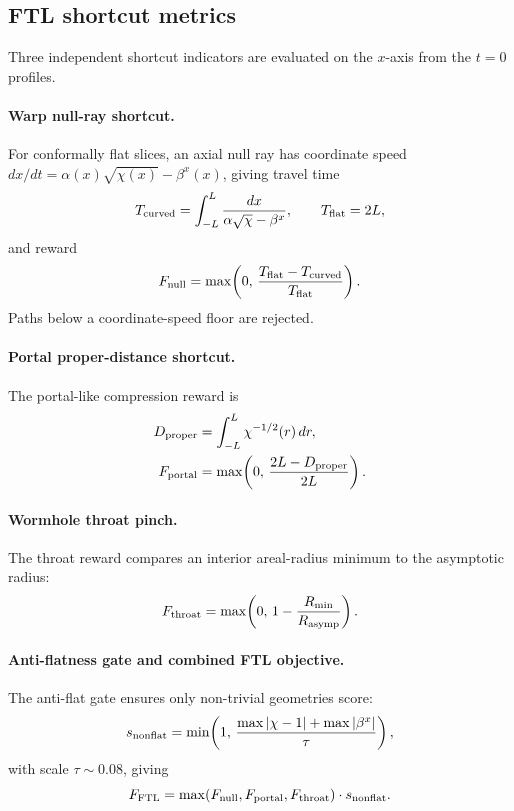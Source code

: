 \documentclass[twocolumn,floatfix,aps,prd,nofootinbib]{revtex4-2}
\begin{document}
\subsection{FTL shortcut metrics}

Three independent shortcut indicators are evaluated on the $x$-axis from the $t=0$ profiles.

\paragraph{Warp null-ray shortcut.}
For conformally flat slices, an axial null ray has coordinate speed $dx/dt = \alpha(x)\sqrt{\chi(x)} - \beta^x(x)$, giving travel time
\begin{equation}
    T_{\rm curved} = \int_{-L}^{L}\frac{dx}{\alpha\sqrt{\chi}-\beta^x}, \qquad
    T_{\rm flat} = 2L,
\end{equation}
and reward
\begin{equation}
    F_{\rm null} = \max\!\left(0,\,\frac{T_{\rm flat}-T_{\rm curved}}{T_{\rm flat}}\right).
\end{equation}
Paths below a coordinate-speed floor are rejected.

\paragraph{Portal proper-distance shortcut.}
The portal-like compression reward is
\begin{align}
    D_{\rm proper}
    &= \int_{-L}^{L}\chi^{-1/2}(r)\,dr, \notag\\
    F_{\rm portal}
    &= \max\!\left(0,\,\frac{2L-D_{\rm proper}}{2L}\right).
\end{align}

\paragraph{Wormhole throat pinch.}
The throat reward compares an interior areal-radius minimum to the asymptotic radius:
\begin{equation}
    F_{\rm throat} = \max\!\left(0,\,1-\frac{R_{\rm min}}{R_{\rm asymp}}\right).
\end{equation}

\paragraph{Anti-flatness gate and combined FTL objective.}
The anti-flat gate ensures only non-trivial geometries score:
\begin{equation}
    s_{\rm nonflat} = \min\!\left(1,\,\frac{\max|\chi-1|+\max|\beta^x|}{\tau}\right),
\end{equation}
with scale $\tau\sim0.08$, giving
\begin{equation}
    F_{\rm FTL} = \max(F_{\rm null},F_{\rm portal},F_{\rm throat})\cdot s_{\rm nonflat}.
\end{equation}
\end{document}
